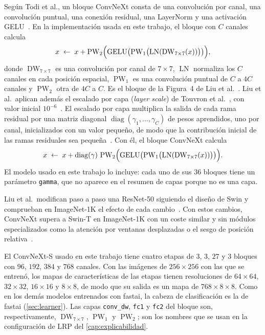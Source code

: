 Según Todi et al., un bloque ConvNeXt consta de una convolución por canal, una
convolución puntual, una conexión residual, una LayerNorm y una activación
GELU~\cite{todi2023convnext}. En la implementación usada en este trabajo, el
bloque con $C$ canales calcula
\[
  x \;\leftarrow\; x + \operatorname{PW}_2\Bigl(\operatorname{GELU}\bigl(\operatorname{PW}_1\bigl(\operatorname{LN}(\operatorname{DW}_{7\times7}(x))\bigr)\bigr)\Bigr),
\]
donde $\operatorname{DW}_{7\times7}$ es una convolución por canal de $7\times7$,
$\operatorname{LN}$ normaliza los $C$ canales en cada posición espacial,
$\operatorname{PW}_1$ es una convolución puntual de $C$ a $4C$ canales y
$\operatorname{PW}_2$ otra de $4C$ a $C$. Es el bloque de la Figura~4 de Liu et
al.~\cite[fig.~4]{liu2022convnext}.
Liu et al.\ aplican además el escalado por capa (\emph{layer scale}) de Touvron et
al.~\cite{touvron2021}, con valor inicial $10^{-6}$~\cite[sec.~3.1]{liu2022convnext}.
El escalado por capa multiplica la salida de cada rama residual por una matriz
diagonal $\operatorname{diag}(\gamma_1,\dots,\gamma_C)$ de pesos aprendidos, uno
por canal, inicializados con un valor pequeño, de modo que la contribución inicial
de las ramas residuales sea pequeña~\cite[sec.~2, ec.~(4)]{touvron2021}. Con él, el
bloque ConvNeXt calcula
\[
  x \;\leftarrow\; x + \operatorname{diag}(\gamma)\,\operatorname{PW}_2\Bigl(\operatorname{GELU}\bigl(\operatorname{PW}_1\bigl(\operatorname{LN}(\operatorname{DW}_{7\times7}(x))\bigr)\bigr)\Bigr).
\]
El modelo usado en este trabajo lo incluye: cada uno de sus $36$ bloques tiene un
parámetro \texttt{gamma}, que no aparece en el resumen de capas porque no es una capa.

Liu et al.\ modifican paso a paso una ResNet-50 siguiendo el diseño de Swin y
comprueban en ImageNet-1K el efecto de cada cambio~\cite[sec.~2]{liu2022convnext}.
Con estos cambios, ConvNeXt supera a Swin-T en ImageNet-1K con un coste
similar y sin módulos especializados como la atención por ventanas desplazadas o
el sesgo de posición relativa~\cite[sec.~2]{liu2022convnext}.

El ConvNeXt-S usado en este trabajo tiene cuatro etapas de $3$, $3$, $27$ y $3$
bloques con $96$, $192$, $384$ y $768$ canales. Con las imágenes de
$256\times256$ con las que se entrenó, los mapas de características de las etapas
tienen resoluciones de $64\times64$, $32\times32$, $16\times16$ y $8\times8$, de
modo que su salida es un mapa de $768\times8\times8$. Como en los demás modelos
entrenados con fastai, la cabeza de clasificación es la de fastai
(\cref{sec:learner}). Las capas \texttt{conv\_dw}, \texttt{fc1} y \texttt{fc2}
del bloque son, respectivamente, $\operatorname{DW}_{7\times7}$,
$\operatorname{PW}_1$ y $\operatorname{PW}_2$; son los nombres que se usan en la
configuración de LRP del \cref{cap:explicabilidad}.

